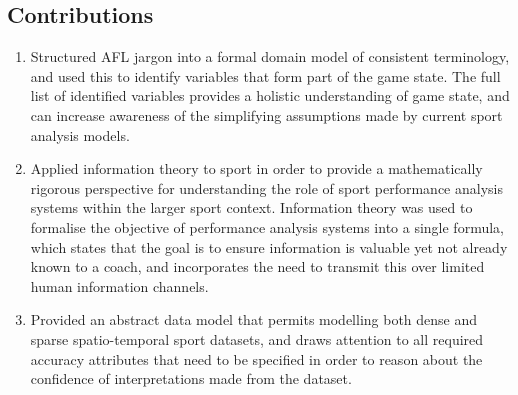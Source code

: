 %





\subsection*{Contributions}

\begin{enumerate}
  \item Structured AFL jargon into a formal domain model of consistent terminology, and used this to identify variables that form part of the game state. The full list of identified variables provides a holistic understanding of game state, and can increase awareness of the simplifying assumptions made by current sport analysis models.
  \item Applied information theory to sport in order to provide a mathematically rigorous perspective for understanding the role of sport performance analysis systems within the larger sport context. Information theory was used to formalise the objective of performance analysis systems into a single formula, which states that the goal is to ensure information is valuable yet not already known to a coach, and incorporates the need to transmit this over limited human information channels.
  \item Provided an abstract data model that permits modelling both dense and sparse spatio-temporal sport datasets, and draws attention to all required accuracy attributes that need to be specified in order to reason about the confidence of interpretations made from the dataset.
\end{enumerate}
